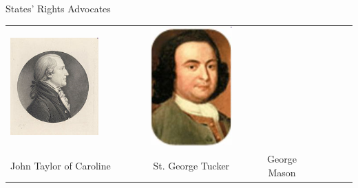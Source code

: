 \begin{frame}{States' Rights Advocates}
\begin{table}[h]
\begin{tabular}{lcccccc}
    \includegraphics[width=0.75\textwidth,height=.3\textheight,keepaspectratio=true]{img/st-george-tucker.png} &
    \includegraphics[width=0.75\textwidth,height=.3\textheight,keepaspectratio=true]{img/george-mason.png} \\
    John Taylor of Caroline &
    St. George Tucker &
    George Mason \\
\end{tabular}
\end{table}
\end{frame}

